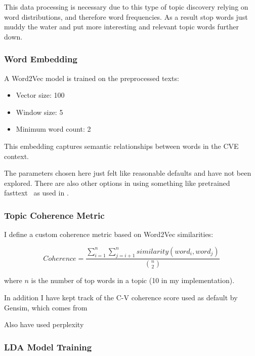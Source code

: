 \documentclass[12pt]{article}
\begin{document}
This data processing is necessary due to this type of topic discovery relying on word distributions,
and therefore word frequencies. As a result stop words just muddy the water and put more interesting
and relevant topic words further down.

\subsubsection{Word Embedding}

A Word2Vec model is trained on the preprocessed texts:

\begin{itemize} \item Vector size: 100 \item Window size: 5 \item Minimum word count: 2
\end{itemize}

This embedding captures semantic relationships between words in the CVE context.

The parameters chosen here just felt like reasonable defaults and have not been explored. There are
also other options in using something like pretrained fasttext~\cite{fasttext} as used in
\cite{nvd_clustering_fasttext}.

\subsubsection{Topic Coherence Metric}

I define a custom coherence metric based on Word2Vec similarities:

\begin{equation}
	Coherence = \frac{\sum_{i=1}^{n}\sum_{j=i+1}^{n} similarity(word_i, word_j)}{\binom{n}{2}}
\end{equation}

where $n$ is the number of top words in a topic (10 in my implementation).

In addition I have kept track of the C-V coherence score used as default by Gensim, which comes from
\cite{cv_coherence}

Also have used perplexity
\subsubsection{LDA Model Training}
\end{document}
